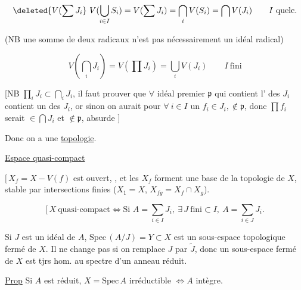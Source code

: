 \[
\deleted{V(\sum J_i}\ V(\bigcup_{i\in I}S_i)=V(\sum J_i)=\bigcap_i V(S_i)=\bigcap V(J_i)
\qquad I\ \text{quelc.}
\]

(NB une  somme de deux   radicaux n'est pas nécessairement un idéal radical)

\[
V(\bigcap_i J_i)=V(\prod J_i)=\bigcup_i V(J_i)\qquad I\ \text{fini}
\]

[NB $\prod_i J_i\subset\bigcap_i J_i$, il faut prouver que $\forall$ idéal premier $\mathfrak p$ qui contient l' des $J_i$ contient un des $J_i$, or sinon on aurait pour $\forall\ i\in I$ un $f_i\in J_i,\notin\mathfrak p$,  donc $\prod f_i$ serait $\in\bigcap J_i$ et $\notin\mathfrak p$, absurde ] 

Donc on a une \uline{topologie}.


\uline{Espace  quasi-compact} 


$[\,X_f=X-V(f)$ est ouvert, , et les  $X_f$ forment une base de la topologie de $X$, stable par intersections finies ($X_{1}=X$, $X_{fg}=X_f\cap X_g$).


\[
\bigl[\,X\ \text{quasi-compact}\Longleftrightarrow
\text{Si } A=\sum_{i\in I}J_i,\ \exists\,J\ \text{fini}\subset I,\ A=\sum_{i\in J}J_i.
\]


Si $J$ est un idéal de $A$, $\mathrm{Spec}\,(A/J)=Y\subset X$ est un sous-espace topologique fermé de $X$.  Il ne change pas si on remplace $J$ par $\widetilde J$, donc  un sous-espace fermé de $X$ est tjrs hom. au spectre d'un anneau réduit.

\uline{Prop} Si $A$ est réduit, $X=\mathrm{Spec}\,A$ irréductible $\Longleftrightarrow A$ intègre.

